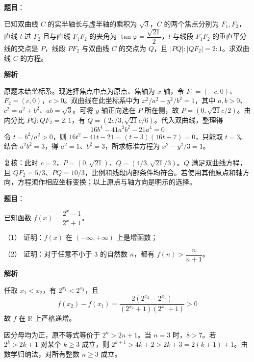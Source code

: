 \begin{answer}

\textbf{题目}：

已知双曲线 $C$ 的实半轴长与虚半轴的乘积为 $\sqrt3$，$C$ 的两个焦点分别为 $F_1,F_2$，直线 $l$ 过 $F_2$ 且与直线 $F_1F_2$ 的夹角为 $\tan\varphi=\dfrac{\sqrt{21}}2$，$l$ 与线段 $F_1F_2$ 的垂直平分线的交点是 $P$，线段 $PF_2$ 与双曲线 $C$ 的交点为 $Q$，且 $|PQ|:|QF_2|=2:1$。求双曲线 $C$ 的方程。

\textbf{解析}

原题未给坐标系。现选择焦点中点为原点、焦轴为 $x$ 轴，令 $F_1=(-c,0)$、$F_2=(c,0)$，$c>0$。双曲线在此坐标系中为 $x^2/a^2-y^2/b^2=1$，其中 $a,b>0$、$c^2=a^2+b^2$、$ab=\sqrt3$。可将 $y$ 轴正向选在 $P$ 所在侧，故 $P=(0,\sqrt{21}c/2)$。由内分比 $PQ:QF_2=2:1$，有 $Q=(2c/3,\sqrt{21}c/6)$。代入双曲线，整理得
\nopagebreak[4]
\[
16b^4-41a^2b^2-21a^4=0
\]
令 $t=b^2/a^2>0$，则 $16t^2-41t-21=(t-3)(16t+7)=0$，只能取 $t=3$。结合 $a^2b^2=3$，得 $a^2=1$、$b^2=3$，所求标准方程为 $x^2-y^2/3=1$。

复核：此时 $c=2$，$P=(0,\sqrt{21})$、$Q=(4/3,\sqrt{21}/3)$。$Q$ 满足双曲线方程，且 $QF_2=5/3$、$PQ=10/3$，比例和线段内部条件均符合。若使用其他原点和轴方向，方程须作相应坐标变换；以上原点与轴方向是明示的选择。


\end{answer}
\begin{answer}

\textbf{题目}：

已知函数 $f(x)=\dfrac{2^x-1}{2^x+1}$。

（1） 证明：$f(x)$ 在 $(-\infty,+\infty)$ 上是增函数；

（2） 证明：对于任意不小于 3 的自然数 $n$，都有 $f(n)>\dfrac n{n+1}$。

\textbf{解析}


任取 $x_1<x_2$，有 $2^{x_1}<2^{x_2}$，且
\nopagebreak[4]
\[
f(x_2)-f(x_1)
=\frac{2(2^{x_2}-2^{x_1})}{(2^{x_2}+1)(2^{x_1}+1)}>0
\]
故 $f$ 在 $\mathbb R$ 上严格递增。


因分母均为正，原不等式等价于 $2^n>2n+1$。当 $n=3$ 时，$8>7$。若 $2^k>2k+1$ 对某个 $k\ge3$ 成立，则 $2^{k+1}>4k+2>2k+3=2(k+1)+1$。由数学归纳法，对所有整数 $n\ge3$ 成立。



\end{answer}